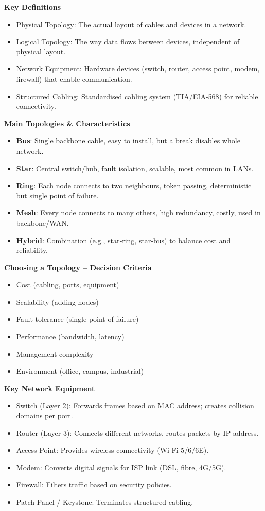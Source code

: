\documentclass[11pt]{article}
\newcommand{\cle}[1]{{\popxbold\color{popdark}#1}}
\begin{document}
\begin{bilan}
\textbf{Key Definitions}
\begin{itemize}
\item \cle{Physical Topology}: The actual layout of cables and devices in a network.
\item \cle{Logical Topology}: The way data flows between devices, independent of physical layout.
\item \cle{Network Equipment}: Hardware devices (switch, router, access point, modem, firewall) that enable communication.
\item \cle{Structured Cabling}: Standardised cabling system (TIA/EIA-568) for reliable connectivity.
\end{itemize}

\textbf{Main Topologies \& Characteristics}
\begin{itemize}
\item \textbf{Bus}: Single backbone cable, easy to install, but a break disables whole network.
\item \textbf{Star}: Central switch/hub, fault isolation, scalable, most common in LANs.
\item \textbf{Ring}: Each node connects to two neighbours, token passing, deterministic but single point of failure.
\item \textbf{Mesh}: Every node connects to many others, high redundancy, costly, used in backbone/WAN.
\item \textbf{Hybrid}: Combination (e.g., star‑ring, star‑bus) to balance cost and reliability.
\end{itemize}

\textbf{Choosing a Topology – Decision Criteria}
\begin{itemize}
\item Cost (cabling, ports, equipment)
\item Scalability (adding nodes)
\item Fault tolerance (single point of failure)
\item Performance (bandwidth, latency)
\item Management complexity
\item Environment (office, campus, industrial)
\end{itemize}

\textbf{Key Network Equipment}
\begin{itemize}
\item \cle{Switch} (Layer 2): Forwards frames based on MAC address; creates collision domains per port.
\item \cle{Router} (Layer 3): Connects different networks, routes packets by IP address.
\item \cle{Access Point}: Provides wireless connectivity (Wi‑Fi 5/6/6E).
\item \cle{Modem}: Converts digital signals for ISP link (DSL, fibre, 4G/5G).
\item \cle{Firewall}: Filters traffic based on security policies.
\item \cle{Patch Panel / Keystone}: Terminates structured cabling.
\end{itemize}


\end{bilan}
\end{document}
